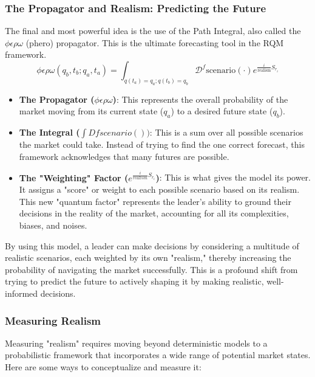 \documentclass{article}
\begin{document}
\subsubsection*{The Propagator and Realism: Predicting the Future}
The final and most powerful idea is the use of the Path Integral, also called the $\phi \epsilon \rho \omega$ (phero) propagator. This is the ultimate forecasting tool in the RQM framework.
\begin{equation}
\phi\epsilon\rho\omega(q_b, t_b; q_a, t_a) = \int_{q(t_a)=q_a; q(t_b)=q_b} \mathcal{D}^f \text{scenario}(\cdot) e^{\frac{i}{\text{realism}} S_{r_i}}
\end{equation}
\begin{itemize}
\item \textbf{The Propagator ($\phi \epsilon \rho \omega$)}: This represents the overall probability of the market moving from its current state ($q_a$) to a desired future state ($q_b$).
\item \textbf{The Integral ($\int Dfscenario())$}: This is a sum over all possible scenarios the market could take. Instead of trying to find the one correct forecast, this framework acknowledges that many futures are possible.
\item \textbf{The "Weighting" Factor ($e^{\frac{i}{realism} S_{r_i}}
$)}: This is what gives the model its power. It assigns a "score" or weight to each possible scenario based on its realism. This new "quantum factor" represents the leader's ability to ground their decisions in the reality of the market, accounting for all its complexities, biases, and noises.
\end{itemize}
By using this model, a leader can make decisions by considering a multitude of realistic scenarios, each weighted by its own "realism," thereby increasing the probability of navigating the market successfully. This is a profound shift from trying to predict the future to actively shaping it by making realistic, well-informed decisions.

\subsubsection*{Measuring Realism}
Measuring "realism" requires moving beyond deterministic models to a probabilistic framework that incorporates a wide range of potential market states. Here are some ways to conceptualize and measure it:
 
\end{document}
